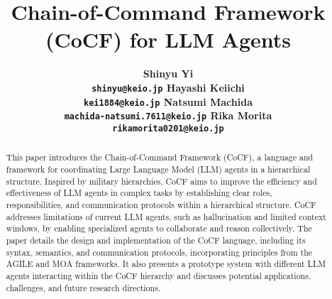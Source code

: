 \title{Chain-of-Command Framework (CoCF) for LLM Agents}

\author{\bf Shinyu Yi \\ \texttt{shinyu@keio.jp} \And \bf Hayashi Keiichi \\ \texttt{kei1884@keio.jp}
\And \bf Natsumi Machida \\ \texttt{machida-natsumi.7611@keio.jp} \And \bf Rika Morita
\\ \texttt{rikamorita0201@keio.jp}}

\date{}
\maketitle
\onehalfspacing

\begin{abstract}
	This paper introduces the Chain-of-Command Framework (CoCF), a language and
	framework for coordinating Large Language Model (LLM) agents in a hierarchical
	structure. Inspired by military hierarchies, CoCF aims to improve the
	efficiency and effectiveness of LLM agents in complex tasks by establishing
	clear roles, responsibilities, and communication protocols within a
	hierarchical structure. CoCF addresses limitations of current LLM agents, such
	as hallucination and limited context windows, by enabling specialized agents to
	collaborate and reason collectively. The paper details the design and
	implementation of the CoCF language, including its syntax, semantics, and communication
	protocols, incorporating principles from the AGILE and MOA frameworks. It also
	presents a prototype system with different LLM agents interacting within the CoCF
	hierarchy and discusses potential applications, challenges, and future research
	directions.
\end{abstract}